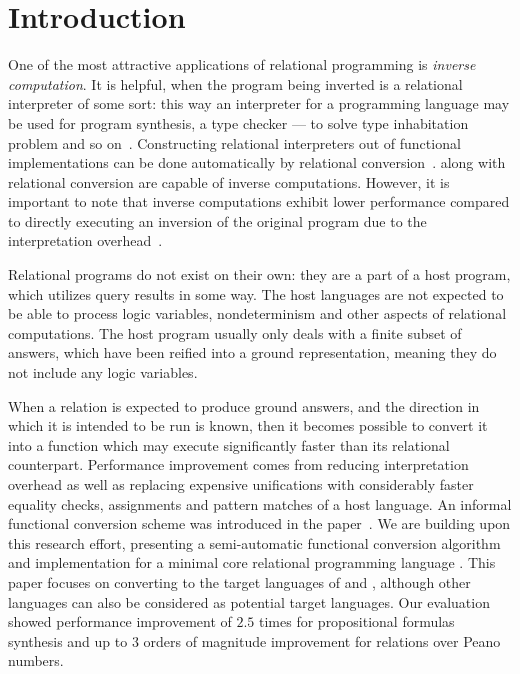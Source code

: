 \section{Introduction}
One of the most attractive applications of relational programming is \emph{inverse computation}.
It is helpful, when the program being inverted is a relational interpreter of some sort: this way an interpreter for a programming language may be used for program synthesis, a type checker --- to solve type inhabitation problem and so on~\cite{Untagged, lozov2019relational}.
Constructing relational interpreters out of functional implementations can be done automatically by relational conversion~\cite{lozov2018typed}.
\mk along with relational conversion are capable of inverse computations.
However, it is important to note that inverse computations exhibit lower performance compared to directly executing an inversion of the original program due to the interpretation overhead~\cite{RevURA,SemanticsModifiers1}.

Relational programs do not exist on their own: they are a part of a host program, which utilizes query results in some way.
The host languages are not expected to be able to process logic variables, nondeterminism and other aspects of relational computations.
The host program usually only deals with a finite subset of answers, which have been reified into a ground representation, meaning they do not include any logic variables.

When a relation is expected to produce ground answers, and the direction in which it is intended to be run is known, then it becomes possible to convert it into a function which may execute significantly faster than its relational counterpart.
Performance improvement comes from reducing interpretation overhead as well as replacing expensive unifications with considerably faster equality checks, assignments and pattern matches of a host language.
An informal functional conversion scheme was introduced in the paper~\cite{verbitskaia2022direction}.
We are building upon this research effort, presenting a semi-automatic functional conversion algorithm and implementation for a minimal core relational programming language \micro.
This paper focuses on converting to the target languages of \haskell and \ocaml, although other languages can also be considered as potential target languages.
Our evaluation showed performance improvement of $2.5$ times for propositional formulas synthesis and up to $3$ orders of magnitude improvement for relations over Peano numbers.